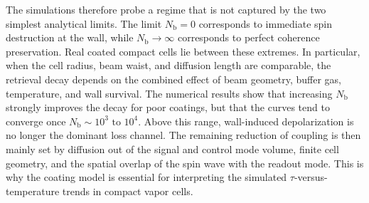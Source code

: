 The simulations therefore probe a regime that is not captured by the two simplest analytical limits. The limit \(N_{\text{b}}=0\) corresponds to immediate spin destruction at the wall, while \(N_{\text{b}}\rightarrow\infty\) corresponds to perfect coherence preservation. Real coated compact cells lie between these extremes. In particular, when the cell radius, beam waist, and diffusion length are comparable, the retrieval decay depends on the combined effect of beam geometry, buffer gas, temperature, and wall survival. The numerical results show that increasing \(N_{\text{b}}\) strongly improves the decay for poor coatings, but that the curves tend to converge once \(N_{\text{b}}\sim 10^3\text{ to }10^4\). Above this range, wall-induced depolarization is no longer the dominant loss channel. The remaining reduction of coupling is then mainly set by diffusion out of the signal and control mode volume, finite cell geometry, and the spatial overlap of the spin wave with the readout mode. This is why the coating model is essential for interpreting the simulated \(\tau\)-versus-temperature trends in compact vapor cells.
